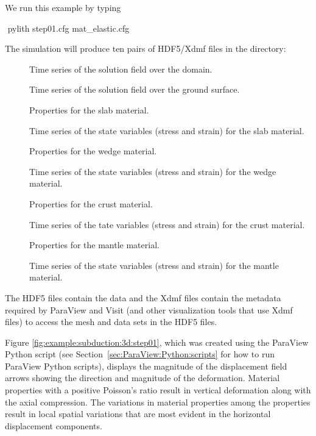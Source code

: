 We run this example by typing
\begin{shell}
$$ pylith step01.cfg mat_elastic.cfg
\end{shell}
The simulation will produce ten pairs of HDF5/Xdmf files in the
 directory:
\begin{description}
\item[] Time series of the solution field over the domain.
\item[] Time series of the solution field over the ground surface.
\item[] Properties for
  the slab material.
\item[] Time series of the state variables (stress and strain) for the slab material.
\item[] Properties for
  the wedge material.
\item[] Time series of the state variables (stress and strain) for the wedge material.
\item[] Properties for
  the crust material.
\item[] Time series of the tate variables
  (stress and strain) for the crust material.
\item[] Properties for
  the mantle material.
\item[] Time series of the state variables
  (stress and strain) for the mantle material.
\end{description}
The HDF5 files contain the data and the Xdmf files contain the
metadata required by ParaView and Visit (and other visualization tools
that use Xdmf files) to access the mesh and data sets in the HDF5
files.

Figure \ref{fig:example:subduction:3d:step01}, which was created using
the ParaView Python script  (see
Section~\vref{sec:ParaView:Python:scripts} for how to run ParaView
Python scripts), displays the magnitude of
the displacement field arrows showing the direction and magnitude of
the deformation. Material properties with a positive Poisson's ratio
result in vertical deformation along with the axial compression. The
variations in material properties among the properties result in local
spatial variations that are most evident in the horizontal
displacement components.

